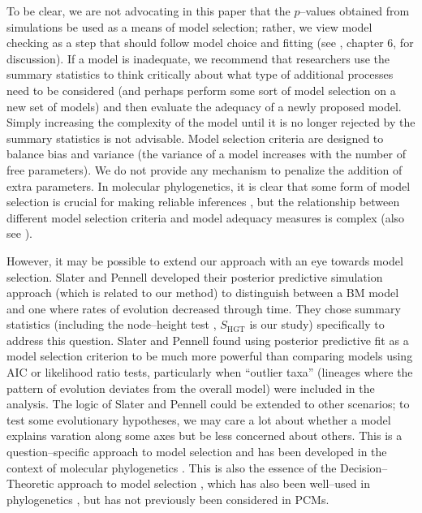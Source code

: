 \documentclass[a4paper,12pt]{article}
\begin{document}
To be clear, we are not advocating in this paper that the $p$--values obtained from simulations be used as a means of model selection; rather, we view model checking as a step that should follow model choice and fitting (see \citep{Gelmanbook}, chapter 6, for discussion). If a model is inadequate, we recommend that researchers use the summary statistics to think critically about what type of additional processes need to be considered (and perhaps perform some sort of model selection on a new set of models) and then evaluate the adequacy of a newly proposed model. Simply increasing the complexity of the model until it is no longer rejected by the summary statistics is not advisable.  Model selection criteria are designed to balance bias and variance (the variance of a model increases with the number of free parameters). We do not provide any mechanism to penalize the addition of extra parameters. In molecular phylogenetics, it is clear that some form of model selection is crucial for making reliable inferences \citep{SullivanJoyce2005, Ripplinger2008}, but the relationship between different model selection criteria and model adequacy measures is complex \citep{Ripplinger2010} (also see \citep{Boettiger2012}). 

However, it may be possible to extend our approach with an eye towards model selection. Slater and Pennell \citep{SlaterPennell} developed their posterior predictive simulation approach (which is related to our method) to distinguish between a BM model and one where rates of evolution decreased through time. They chose summary statistics (including the node--height test \citep{FreckletonHarvey2006}, $S_{\text{HGT}}$ is our study) specifically to address this question. Slater and Pennell found using posterior predictive fit as a model selection criterion to be much more powerful than comparing models using AIC or likelihood ratio tests, particularly when ``outlier taxa'' (lineages where the pattern of evolution deviates from the overall model) were included in the analysis. The logic of Slater and Pennell could be extended to other scenarios; to test some evolutionary hypotheses, we may care a lot about whether a model explains varation along some axes but be less concerned about others. This is a question--specific approach to model selection and has been developed in the context of molecular phylogenetics \citep{Bollback2002, Lewis2013}. This is also the essence of the Decision--Theoretic approach to model selection \citep{Robert2007}, which has also been well--used in phylogenetics \citep{Minin2003}, but has not previously been considered in PCMs.
\end{document}
